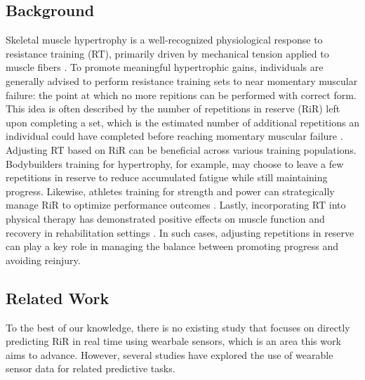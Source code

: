 \documentclass[conference]{IEEEtran}
\begin{document}
\subsection{Background}
Skeletal muscle hypertrophy is a well-recognized physiological response to resistance training (RT), primarily driven by mechanical tension applied to muscle fibers \cite{refalo2024similar}. To promote meaningful hypertrophic gains, individuals are generally advised to perform resistance training sets to near momentary muscular failure: the point at which no more repitions can be performed with correct form. This idea is often described by the number of repetitions in reserve (RiR) left upon completing a set, which is the estimated number of additional repetitions an individual could have completed before reaching momentary muscular failure \cite{refalo2024similar}. Adjusting RT based on RiR can be beneficial across various training populations. Bodybuilders training for hypertrophy, for example, may choose to leave a few repetitions in reserve to reduce accumulated fatigue while still maintaining progress. Likewise, athletes training for strength and power can strategically manage RiR to optimize performance outcomes \cite{refalo2024similar, izquierdo2006differential}. Lastly, incorporating RT into physical therapy has demonstrated positive effects on muscle function and recovery in rehabilitation settings \cite{kristensen2012resistance}. In such cases, adjusting repetitions in reserve can play a key role in managing the balance between promoting progress and avoiding reinjury.

\subsection{Related Work}
To the best of our knowledge, there is no existing study that focuses on directly predicting RiR in real time using wearbale sensors, which is an area this work aims to advance. However, several studies have explored the use of wearable sensor data for related predictive tasks.
\end{document}
